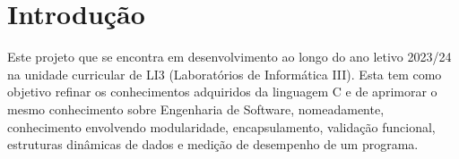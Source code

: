 \documentclass[a4paper,12pt]{scrreprt}
\begin{document}

\makecover





\renewcommand{\contentsname}{Índice}

\tableofcontents

\pagebreak


\pagebreak

\pagebreak






    
    



\chapter{Introdução}

Este projeto que se encontra em desenvolvimento ao longo do ano letivo 2023/24 na unidade curricular de LI3 (Laboratórios de Informática III). Esta tem como objetivo refinar os conhecimentos adquiridos da linguagem C e de aprimorar o mesmo conhecimento sobre Engenharia de Software, nomeadamente, conhecimento envolvendo modularidade, encapsulamento, validação funcional, estruturas dinâmicas de dados e medição de desempenho de um programa.
\end{document}
